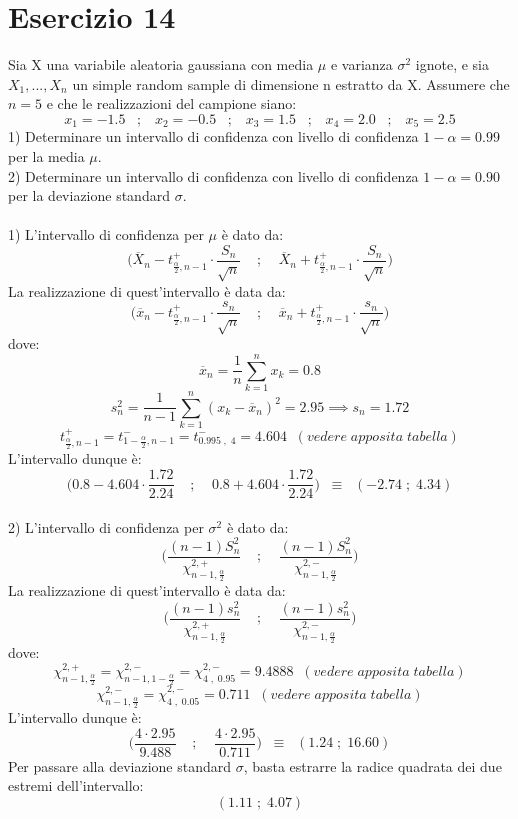 \documentclass{article}
\begin{document}
\section*{Esercizio 14}
Sia X una variabile aleatoria gaussiana con media $\mu$ e varianza $\sigma^{2}$ ignote, e sia $X_{1},...,X_{n}$ un simple random sample di dimensione n estratto da X. Assumere che $n=5$ e che le realizzazioni del campione siano:
\[ x_{1} = -1.5 \; \; \; ; \; \; \; x_{2} = -0.5 \; \; \; ; \; \; \; x_{3} = 1.5 \; \; \; ; \; \; \; x_{4} = 2.0 \; \; \; ; \; \; \; x_{5} = 2.5 \]
1) Determinare un intervallo di confidenza con livello di confidenza $1-\alpha = 0.99$ per la media $\mu$.\\
2) Determinare un intervallo di confidenza con livello di confidenza $1-\alpha = 0.90$ per la deviazione standard $\sigma$.\\
\\
1) L'intervallo di confidenza per $\mu$ è dato da:
\[ \Bigg( \overline{X}_{n} - t_{\frac{\alpha}{2},n-1}^{+} \cdot \frac{S_{n}}{\sqrt{n}} \; \; \; \; ; \; \; \; \; \overline{X}_{n} + t_{\frac{\alpha}{2},n-1}^{+} \cdot \frac{S_{n}}{\sqrt{n}} \Bigg) \]
La realizzazione di quest'intervallo è data da:
\[ \Bigg( \overline{x}_{n} - t_{\frac{\alpha}{2},n-1}^{+} \cdot \frac{s_{n}}{\sqrt{n}} \; \; \; \; ; \; \; \; \; \overline{x}_{n} + t_{\frac{\alpha}{2},n-1}^{+} \cdot \frac{s_{n}}{\sqrt{n}} \Bigg) \]
dove:
\[ \overline{x}_{n} = \frac{1}{n} \sum_{k=1}^{n}x_{k} = 0.8 \]
\[ s_{n}^{2} = \frac{1}{n-1} \sum_{k=1}^{n}(x_{k}-\overline{x}_{n})^{2} = 2.95 \implies s_{n} = 1.72 \]
\[ t_{\frac{\alpha}{2},n-1}^{+} = t_{1-\frac{\alpha}{2},n-1}^{-} = t_{0.995 \; , \; 4}^{-} = 4.604 \; \; (vedere \; apposita \; tabella) \]
L'intervallo dunque è:
\[ \Big( 0.8 - 4.604 \cdot \frac{1.72}{2.24} \; \; \; \; ; \; \; \; \; 0.8 + 4.604 \cdot \frac{1.72}{2.24} \Big) \; \; \equiv \; \; (-2.74 \; ; \; 4.34) \]
\\
2) L'intervallo di confidenza per $\sigma^{2}$ è dato da:
\[ \Bigg( \frac{(n-1)S_{n}^{2}}{\chi_{n-1,\frac{\alpha}{2}}^{2,+}} \; \; \; \; ; \; \; \; \; \frac{(n-1)S_{n}^{2}}{\chi_{n-1,\frac{\alpha}{2}}^{2,-}} \Bigg) \]
La realizzazione di quest'intervallo è data da:
\[ \Bigg( \frac{(n-1)s_{n}^{2}}{\chi_{n-1,\frac{\alpha}{2}}^{2,+}} \; \; \; \; ; \; \; \; \; \frac{(n-1)s_{n}^{2}}{\chi_{n-1,\frac{\alpha}{2}}^{2,-}} \Bigg) \]
dove:
\[ \chi_{n-1,\frac{\alpha}{2}}^{2,+} = \chi_{n-1,1-\frac{\alpha}{2}}^{2,-} = \chi_{4 \; , \; 0.95}^{2,-} = 9.4888 \; \; (vedere \; apposita \; tabella) \]
\[ \chi_{n-1,\frac{\alpha}{2}}^{2,-} = \chi_{4 \; , \; 0.05}^{2,-} = 0.711 \; \; (vedere \; apposita \; tabella) \]
L'intervallo dunque è:
\[ \Big( \frac{4 \cdot 2.95}{9.488} \; \; \; \; ; \; \; \; \; \frac{4 \cdot 2.95}{0.711} \Big) \; \; \equiv \; \; (1.24 \; ; \; 16.60) \]
Per passare alla deviazione standard $\sigma$, basta estrarre la radice quadrata dei due estremi dell'intervallo:
\[ (1.11 \; ; \; 4.07) \]
\end{document}
